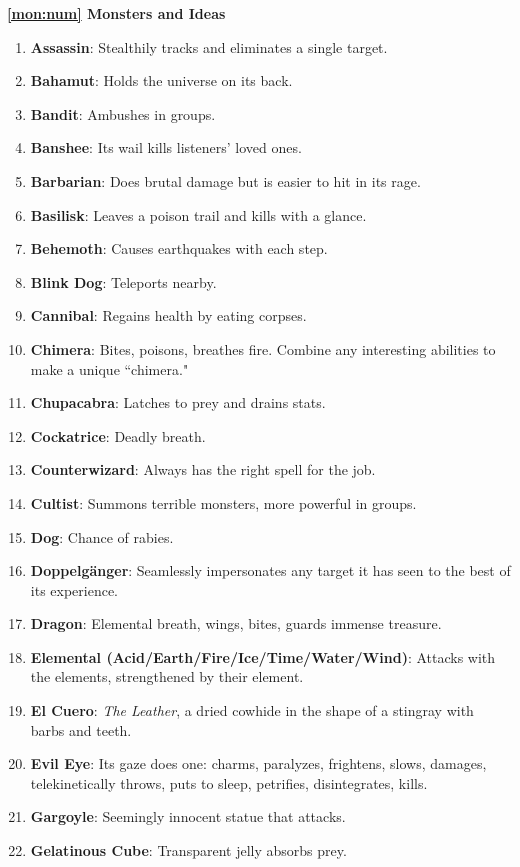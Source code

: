 \documentclass[twoside]{article}
\begin{document}
\textbf{\ref*{mon:num} Monsters and Ideas}
\begin{enumerate}[nosep]
\item \textbf{Assassin}: Stealthily tracks and eliminates a single target.
\item \textbf{Bahamut}: Holds the universe on its back.
\item \textbf{Bandit}: Ambushes in groups.
\item \textbf{Banshee}: Its wail kills listeners' loved ones.
\item \textbf{Barbarian}: Does brutal damage but is easier to hit in its rage.
\item \textbf{Basilisk}: Leaves a poison trail and kills with a glance.
\item \textbf{Behemoth}: Causes earthquakes with each step.
\item \textbf{Blink Dog}: Teleports nearby.
\item \textbf{Cannibal}: Regains health by eating corpses.
\item \textbf{Chimera}: Bites, poisons, breathes fire. Combine any interesting abilities to make a unique ``chimera."
\item \textbf{Chupacabra}: Latches to prey and drains stats.
\item \textbf{Cockatrice}: Deadly breath.
\item \textbf{Counterwizard}: Always has the right spell for the job.
\item \textbf{Cultist}: Summons terrible monsters, more powerful in groups.
\item \textbf{Dog}: Chance of rabies.
\item \textbf{Doppelg\"anger}: Seamlessly impersonates any target it has seen to the best of its experience.
\item \textbf{Dragon}: Elemental breath, wings, bites, guards immense treasure.
\item \textbf{Elemental (Acid/Earth/Fire/Ice/Time/Water/Wind)}: Attacks with the elements, strengthened by their element.
\item \textbf{El Cuero}: \emph{The Leather}, a dried cowhide in the shape of a stingray with barbs and teeth.
\item \textbf{Evil Eye}: Its gaze does one: charms, paralyzes, frightens, slows, damages, telekinetically throws, puts to sleep, petrifies, disintegrates, kills.
\item \textbf{Gargoyle}: Seemingly innocent statue that attacks.
\item \textbf{Gelatinous Cube}: Transparent jelly absorbs prey.

\end{enumerate}
\end{document}
